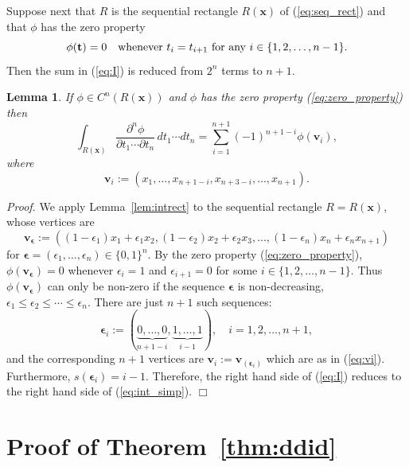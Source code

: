\documentclass[12pt]{article}
\def\bft{\mathbf{t}}
\def\bfx{\mathbf{x}}
\def\bfv{\mathbf{v}}
\def\bfeps{{\boldsymbol \epsilon}}
\newtheorem{lemma}{Lemma}
\newenvironment{proof}{\begin{trivlist}\item[]{\emph{Proof.}}}
               {\hfill$\Box$\end{trivlist}}
\begin{document}
Suppose next that $R$ is the sequential rectangle $R(\bfx)$
of (\ref{eq:seq_rect})
and that $\phi$ has the zero property
\begin{equation}\label{eq:zero_property}
\phi(\bft) = 0 \quad \hbox{whenever $t_i = t_{i+1}$
for any $i \in \{1,2,\ldots,n-1\}$.}
\end{equation}
Then the sum in (\ref{eq:I}) is reduced from $2^n$ terms to $n+1$.
\begin{lemma}\label{lem:iid}
If $\phi \in C^n(R(\bfx))$ and $\phi$ has the zero property
(\ref{eq:zero_property}) then
\begin{equation}\label{eq:int_simp}
\int_{R(\bfx)}
\frac{\partial^n \phi}{\partial t_1 \cdots \partial t_n}
\, dt_1 \cdots dt_n
= \sum_{i=1}^{n+1} (-1)^{n+1-i} \phi(\bfv_i),
\end{equation}
where
\begin{equation}\label{eq:vi}
\bfv_i := (x_1,\ldots,x_{n+1-i},x_{n+3-i},\ldots,x_{n+1}).
\end{equation}
\end{lemma}

\begin{proof}
We apply Lemma~\ref{lem:intrect} to the sequential rectangle
$R = R(\bfx)$, whose vertices are
$$ \bfv_\bfeps := ((1-\epsilon_1)x_1 + \epsilon_1 x_2,
(1-\epsilon_2)x_2 + \epsilon_2 x_3,
	\ldots, (1-\epsilon_n)x_n + \epsilon_n x_{n+1}) $$
for $\bfeps = (\epsilon_1,\ldots,\epsilon_n) \in \{0,1\}^n$.
By the zero property (\ref{eq:zero_property}),
$\phi(\bfv_\bfeps) = 0$ whenever $\epsilon_i = 1$ and $\epsilon_{i+1} = 0$
for some $i \in \{1,2,\ldots,n-1\}$.
Thus $\phi(\bfv_\bfeps)$ can only be non-zero if the
sequence $\bfeps$ is non-decreasing,
$\epsilon_1 \le \epsilon_2 \le \cdots \le \epsilon_n$.
There are just $n+1$ such sequences:
\begin{equation}\label{eq:epsdistinct}
\bfeps_i := (\underbrace{0,\ldots,0}_{n+1-i},
	\underbrace{1,\ldots,1}_{i-1}),
\quad i=1,2,\ldots,n+1,
\end{equation}
and the corresponding $n+1$ vertices are
$\bfv_i := \bfv_{(\bfeps_i)}$ which are as in (\ref{eq:vi}).
Furthermore, $s(\bfeps_i) = i-1$.
Therefore, the right hand side of (\ref{eq:I}) reduces to
the right hand side of (\ref{eq:int_simp}).
\end{proof}

\section{Proof of Theorem~\ref{thm:ddid}}
\end{document}
